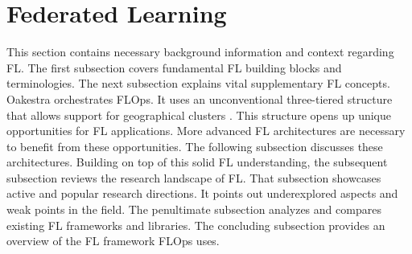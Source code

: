 \section{Federated Learning}\label{section:federated_learning}

This section contains necessary background information and context regarding FL.
The first subsection covers fundamental FL building blocks and terminologies.
The next subsection explains vital supplementary FL concepts.
Oakestra orchestrates FLOps.
It uses an unconventional three-tiered structure that allows support for geographical clusters \cite{paper:oakestra_usenix}.
This structure opens up unique opportunities for FL applications.
More advanced FL architectures are necessary to benefit from these opportunities.
The following subsection discusses these architectures.
Building on top of this solid FL understanding, the subsequent subsection reviews the research landscape of FL.
That subsection showcases active and popular research directions.
It points out underexplored aspects and weak points in the field.
The penultimate subsection analyzes and compares existing FL frameworks and libraries.
The concluding subsection provides an overview of the FL framework FLOps uses.






